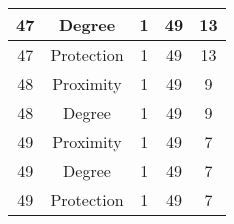 \documentclass[results.tex]{subfiles}
\begin{document}
\begin{center}
\begin{tabular}{| c || c | c | c | c |}
            \hline
            47                      & Degree                       & 1                      & 49                      & 13                   \\
            \hline
            47                      & Protection                   & 1                      & 49                      & 13                   \\
            \hline
            48                      & Proximity                    & 1                      & 49                      & 9                    \\
            \hline
            48                      & Degree                       & 1                      & 49                      & 9                    \\
            \hline
            49                      & Proximity                    & 1                      & 49                      & 7                    \\
            \hline
            49                      & Degree                       & 1                      & 49                      & 7                    \\
            \hline
            49                      & Protection                   & 1                      & 49                      & 7                    \\
            \hline
        \end{tabular}
    \end{center}
\end{document}
